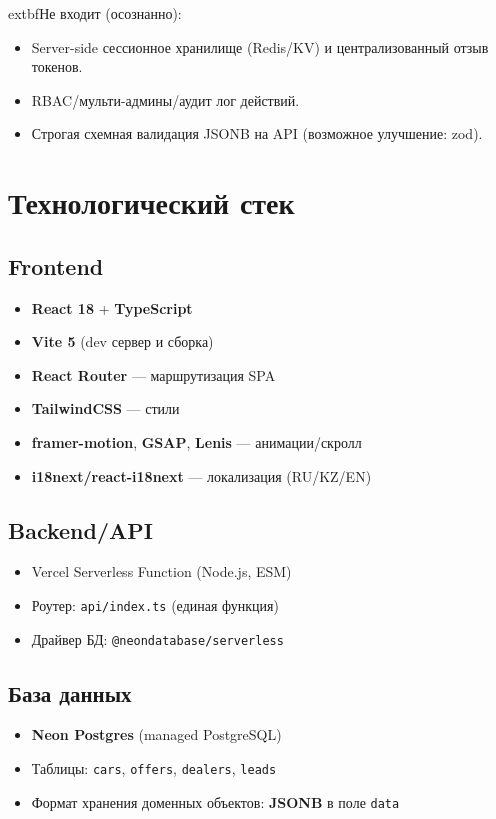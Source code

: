 \documentclass[12pt,a4paper]{article}
\begin{document}
	extbf{Не входит (осознанно):}
\begin{itemize}[leftmargin=18pt]
  \item Server-side сессионное хранилище (Redis/KV) и централизованный отзыв токенов.
  \item RBAC/мульти-админы/аудит лог действий.
  \item Строгая схемная валидация JSONB на API (возможное улучшение: zod).
\end{itemize}

\section{Технологический стек}
\subsection{Frontend}
\begin{itemize}[leftmargin=18pt]
  \item \textbf{React 18} + \textbf{TypeScript}
  \item \textbf{Vite 5} (dev сервер и сборка)
  \item \textbf{React Router} --- маршрутизация SPA
  \item \textbf{TailwindCSS} --- стили
  \item \textbf{framer-motion}, \textbf{GSAP}, \textbf{Lenis} --- анимации/скролл
  \item \textbf{i18next/react-i18next} --- локализация (RU/KZ/EN)
\end{itemize}

\subsection{Backend/API}
\begin{itemize}[leftmargin=18pt]
  \item Vercel Serverless Function (Node.js, ESM)
  \item Роутер: \texttt{api/index.ts} (единая функция)
  \item Драйвер БД: \texttt{@neondatabase/serverless}
\end{itemize}

\subsection{База данных}
\begin{itemize}[leftmargin=18pt]
  \item \textbf{Neon Postgres} (managed PostgreSQL)
  \item Таблицы: \texttt{cars}, \texttt{offers}, \texttt{dealers}, \texttt{leads}
  \item Формат хранения доменных объектов: \textbf{JSONB} в поле \texttt{data}
\end{itemize}
\end{document}
